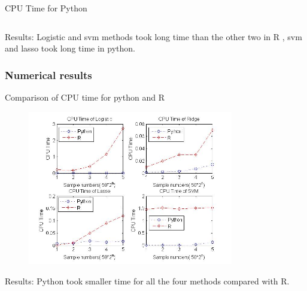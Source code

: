 \documentclass{beamer}
\begin{document}
\begin{frame}
\begin{columns}
\begin{block}{CPU Time for Python}
\begin{figure}
    \end{figure}
\end{block}

\end{columns}

\begin{block}{Results:}
Logistic and svm methods took long time than the other two in R , svm and lasso took long time in python.\\

\end{block}


\end{frame}

\begin{frame}
\frametitle{Numerical results}
\begin{block}{Comparison of CPU time for python and R }
\begin{center}
 \begin{figure}
     \includegraphics[width=0.8\textwidth, height=0.7\textheight]{cputime_python_r.jpg}

    \end{figure}
\end{center}
\end{block}

\begin{block}{Results:}
Python took smaller time for all the four methods compared with R.
\end{block}

\end{frame}
\end{document}

